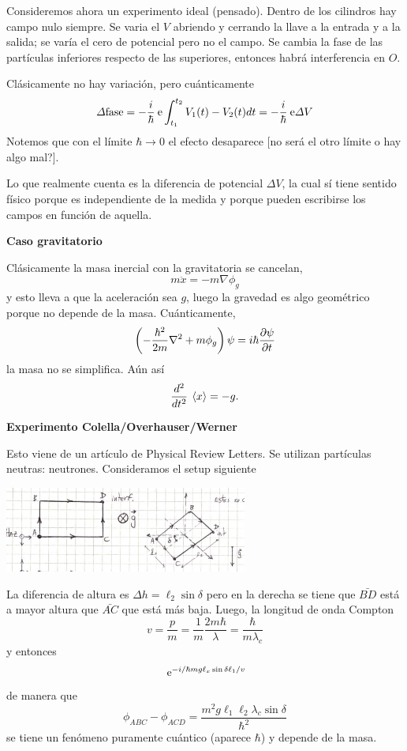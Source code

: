 \documentclass[10pt,oneside]{CBFT_book}
\begin{document}
Consideremos ahora un experimento ideal (pensado). 
Dentro de los cilindros hay campo nulo siempre. Se varia el $V$ abriendo y cerrando la 
llave a la entrada y a la salida; se varía el cero de potencial pero no el campo.
Se cambia la fase de las partículas inferiores respecto de las superiores, entonces habrá interferencia en 
$O$.

Clásicamente no hay variación, pero cuánticamente
\[
	\Delta \text{fase} = -\frac{i}{\hbar}\euler \int _{t_1}^{t_2} V_1(t) - V_2(t) dt = 
	-\frac{i}{\hbar}\euler \Delta V
\]
Notemos que con el límite $\hbar \to 0$ el efecto desaparece [no será el otro límite o hay algo mal?].

Lo que realmente cuenta es la diferencia de potencial $\Delta V$, la cual sí tiene sentido físico porque es 
independiente de la medida y porque pueden escribirse los campos en función de aquella.

\begin{ejemplo}{\bf Caso gravitatorio}
 
Clásicamente la masa inercial con la gravitatoria se cancelan,
\[
	m \ddot{x} = - m \nabla \phi_g
\]
y esto lleva a que la aceleración sea $g$, luego la gravedad es algo geométrico porque no depende de la masa.
Cuánticamente,
\[
	\left( -\frac{\hbar^2}{2m}\nabla^2 + m \phi_g \right) \psi = i \hbar \dpar{\psi}{t}
\]
la masa no se simplifica. Aún así 
\[
	\dtot[2]{}{t} \vm{x} = - g.
\]

 
\end{ejemplo}


\begin{ejemplo}{\bf Experimento Colella/Overhauser/Werner}

Esto viene de un artículo de Physical Review Letters.
Se utilizan partículas neutras: neutrones.
Consideramos el setup siguiente
 
\includegraphics[width=0.6\textwidth]{images/fig_ft2_colella.jpg} 

La diferencia de altura es $\Delta h = \ell_2 \sin \delta $ pero en la derecha se tiene que
$\bar{BD}$ está a mayor altura que $\bar{AC}$ que está más baja.
Luego, la longitud de onda Compton
\[
	v = \frac{p}{m} = \frac{1}{m} \frac{2m\hbar}{\lambda} = \frac{\hbar}{m\lambda_c}
\]
y entonces
\[
	\euler^{ - i/\hbar m g \ell_x \sin \delta \ell_1/v }
\]
de manera que
\[
	\phi_{ABC} - \phi_{ACD} = \frac{ m^2 g \ell_1 \ell_2 \lambda_c \sin \delta }{\hbar^2}
\]
se tiene un fenómeno puramente cuántico (aparece $\hbar$) y depende de la masa.
  
\end{ejemplo}
\end{document}
